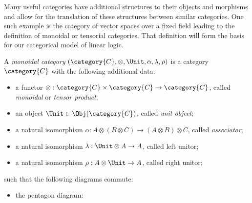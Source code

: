 \documentclass[DIN, pagenumber=false, fontsize=11pt, parskip=half, colorinlistoftodos, svgnames]{scrartcl}
\begin{document}
	
	Many useful categories have additional structures to their objects and morphisms and allow for the translation of these structures between similar categories. One such example is the category of vector spaces over a fixed field leading to the definition of monoidal or tensorial categories. That definition will form the basis for our categorical model of linear logic.
	
	
	\begin{definition}
		\label{def: monoCat}
		A \emph{monoidal category} $(\category{C}, \otimes, \Unit, \alpha, \lambda, \rho)$ is a category $\category{C}$ with the following additional data:
		\begin{itemize}
			\item 
				a functor $\otimes : \category{C} \times \category{C} \rightarrow \category{C} $, called \emph{monoidal} or \emph{tensor product};
			\item 
				an object $\Unit \in  \Obj(\category{C})$, called \emph{unit object};
			\item 
				a natural isomorphism $\alpha: A \otimes (B \otimes C ) \rightarrow (A \otimes B) \otimes C$, called \emph{associator};
			\item 
				a natural isomorphism $\lambda: \Unit \otimes A \rightarrow A$, called left unitor;
			\item 
				a natural isomorphism $\rho: A \otimes \Unit \rightarrow A$, called right unitor;
		\end{itemize}
		such that the following diagrams commute:
		\begin{itemize}
			\item the pentagon diagram: 
			\begin{center}
			\end{center}
			

\end{itemize}
\end{definition}
\end{document}

